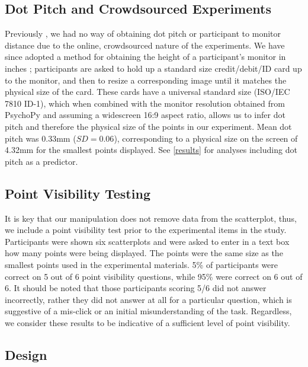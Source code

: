 \documentclass{vgtc}                          %
\begin{document}
\hypertarget{dot-pitch-and-crowdsourced-experiments}{%
\subsection{Dot Pitch and Crowdsourced Experiments}\label{dot-pitch-and-crowdsourced-experiments}}

Previously \cite{strain_2023}, we had no way of obtaining dot pitch
or participant to monitor distance due to the online, crowdsourced nature of the
experiments. We have since adopted a method for obtaining the height of a
participant's monitor in inches \cite{screenscale}; participants are asked to hold up a standard size
credit/debit/ID card up to the monitor, and then to resize a corresponding image until
it matches the physical size of the card. These cards have a universal
standard size (ISO/IEC 7810 ID-1), which when combined with
the monitor resolution obtained from PsychoPy \cite{pierce_psychopy_2019}
and assuming a widescreen 16:9 aspect ratio,
allows us to infer dot pitch and therefore the physical size of the points in our
experiment. Mean dot pitch was 0.33mm (\(SD = 0.06\)),
corresponding to a physical size on the screen of 4.32mm
for the smallest points displayed. See \autoref{results} for analyses including dot pitch as a predictor.

\hypertarget{point-visibility-testing}{%
\subsection{Point Visibility Testing}\label{point-visibility-testing}}

It is key that our manipulation does not remove data from the scatterplot,
thus, we include a point visibility test prior to the experimental items in the study.
Participants were shown six scatterplots
and were asked to enter in a text box how many points
were being displayed. The points were the same size as the smallest points used
in the experimental materials. 5\% of
participants were correct on 5 out of 6 point
visibility questions, while 95\% were correct
on 6 out of 6. It should be noted that those
participants scoring 5/6 did not answer incorrectly, rather they did not answer
at all for a particular question, which is suggestive of
a mis-click or an initial misunderstanding of the task. Regardless,
we consider these results to be indicative of a sufficient level of
point visibility.

\hypertarget{design}{%
\subsection{Design}\label{design}}
\end{document}
